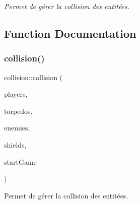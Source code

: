 \begin{DoxyCompactItemize}
\begin{DoxyCompactList}\small\item\em Permet de gérer la collision des entitées. \end{DoxyCompactList}\end{DoxyCompactItemize}


\subsection{Function Documentation}
\mbox{\label{namespacecollision_ae1b29fbda8203c6556c2038306ce36e7}} 
\subsubsection{\texorpdfstring{collision()}{collision()}}
{\footnotesize\ttfamily collision\+::collision (\begin{DoxyParamCaption}\item[{std\+::vector$<$ \hyperlink{structplayer_1_1_player}{player\+::\+Player} $>$ \&}]{players,  }\item[{std\+::vector$<$ \hyperlink{structtorpedo_1_1_torpedo}{torpedo\+::\+Torpedo} $>$ \&}]{torpedos,  }\item[{std\+::vector$<$ \hyperlink{structenemy_1_1_enemy}{enemy\+::\+Enemy} $>$ \&}]{enemies,  }\item[{std\+::vector$<$ \hyperlink{structshield_1_1_shield}{shield\+::\+Shield} $>$ \&}]{shields,  }\item[{std\+::vector$<$ \hyperlink{structstart_game_1_1_start_game}{start\+Game\+::\+Start\+Game} $>$ \&}]{start\+Game }\end{DoxyParamCaption})}



Permet de gérer la collision des entitées. 


